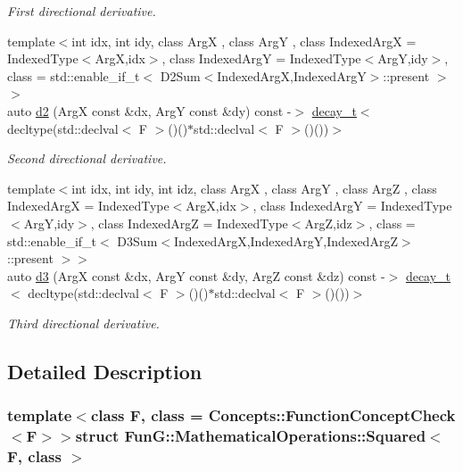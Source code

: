 \begin{DoxyCompactItemize}
\begin{DoxyCompactList}\small\item\em First directional derivative. \end{DoxyCompactList}\item 
{\footnotesize template$<$int idx, int idy, class Arg\-X , class Arg\-Y , class Indexed\-Arg\-X  = Indexed\-Type$<$\-Arg\-X,idx$>$, class Indexed\-Arg\-Y  = Indexed\-Type$<$\-Arg\-Y,idy$>$, class  = std\-::enable\-\_\-if\-\_\-t$<$ D2\-Sum$<$\-Indexed\-Arg\-X,\-Indexed\-Arg\-Y$>$\-::present $>$$>$ }\\auto \hyperlink{structFunG_1_1MathematicalOperations_1_1Squared_a242fd8a14c0fc68070e8beb7527968be}{d2} (Arg\-X const \&dx, Arg\-Y const \&dy) const -\/$>$ \hyperlink{namespaceFunG_a195ac37d8696970c89b112c81a1e4d6e}{decay\-\_\-t}$<$ decltype(std\-::declval$<$ F $>$()()$\ast$std\-::declval$<$ F $>$()())$>$
\begin{DoxyCompactList}\small\item\em Second directional derivative. \end{DoxyCompactList}\item 
{\footnotesize template$<$int idx, int idy, int idz, class Arg\-X , class Arg\-Y , class Arg\-Z , class Indexed\-Arg\-X  = Indexed\-Type$<$\-Arg\-X,idx$>$, class Indexed\-Arg\-Y  = Indexed\-Type$<$\-Arg\-Y,idy$>$, class Indexed\-Arg\-Z  = Indexed\-Type$<$\-Arg\-Z,idz$>$, class  = std\-::enable\-\_\-if\-\_\-t$<$ D3\-Sum$<$\-Indexed\-Arg\-X,\-Indexed\-Arg\-Y,\-Indexed\-Arg\-Z$>$\-::present $>$$>$ }\\auto \hyperlink{structFunG_1_1MathematicalOperations_1_1Squared_a262e69cb557d5beb33f3d2c4da561215}{d3} (Arg\-X const \&dx, Arg\-Y const \&dy, Arg\-Z const \&dz) const -\/$>$ \hyperlink{namespaceFunG_a195ac37d8696970c89b112c81a1e4d6e}{decay\-\_\-t}$<$ decltype(std\-::declval$<$ F $>$()()$\ast$std\-::declval$<$ F $>$()())$>$
\begin{DoxyCompactList}\small\item\em Third directional derivative. \end{DoxyCompactList}\end{DoxyCompactItemize}


\subsection{Detailed Description}
\subsubsection*{template$<$class F, class = Concepts\-::\-Function\-Concept\-Check$<$\-F$>$$>$struct Fun\-G\-::\-Mathematical\-Operations\-::\-Squared$<$ F, class $>$}

